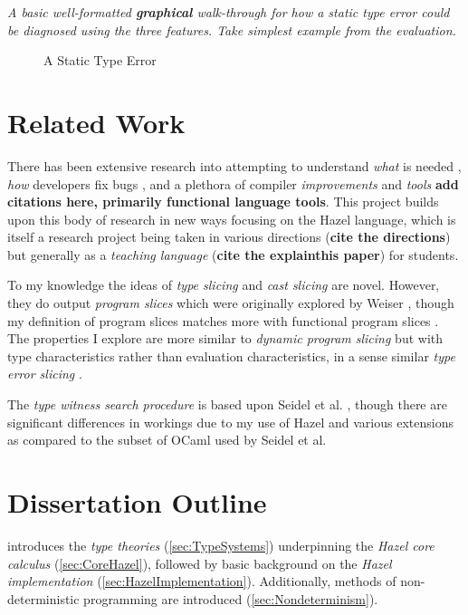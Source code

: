  \textit{A basic well-formatted \textbf{graphical} walk-through for how a static type error could be diagnosed using the three features. Take simplest example from the evaluation.}

\begin{figure}

\caption{A Static Type Error}
\label{fig:ErrorExample}
\end{figure}

\section{Related Work}
\label{sec:RelatedWork}
There has been extensive research into attempting to understand \textit{what} is needed \cite{DebugNeeds}, \textit{how} developers fix bugs \cite{HowFixBugs}, and a plethora of compiler \textit{improvements} and \textit{tools} \textbf{add citations here, primarily functional language tools}. This project builds upon this body of research in new ways focusing on the Hazel language, which is itself a research project being taken in various directions (\textbf{cite the directions}) but generally as a \textit{teaching language} (\textbf{cite the explainthis paper}) for students. 

To my knowledge the ideas of \textit{type slicing} and \textit{cast slicing} are novel. However, they do output \textit{program slices} which were originally explored by Weiser \cite{ProgSlice}, though my definition of program slices matches more with functional program slices \cite{FunctionalProgExplain}.  The properties I explore are more similar to \textit{dynamic program slicing} \cite{DynProgSlice} but with type characteristics rather than evaluation characteristics, in a sense similar \textit{type error slicing} \cite{ErrSlice}.

The \textit{type witness search procedure} is	 based upon Seidel et al. \cite{SearchProc}, though there are significant differences in workings due to my use of Hazel and various extensions as compared to the subset of OCaml used by Seidel et al.

\section{Dissertation Outline}
\label{sec:Outline}
 introduces the \textit{type theories} (\cref{sec:TypeSystems}) underpinning the \textit{Hazel core calculus} (\cref{sec:CoreHazel}), followed by basic background on the \textit{Hazel implementation} (\cref{sec:HazelImplementation}). Additionally, methods of non-deterministic programming are introduced (\cref{sec:Nondeterminism}).

